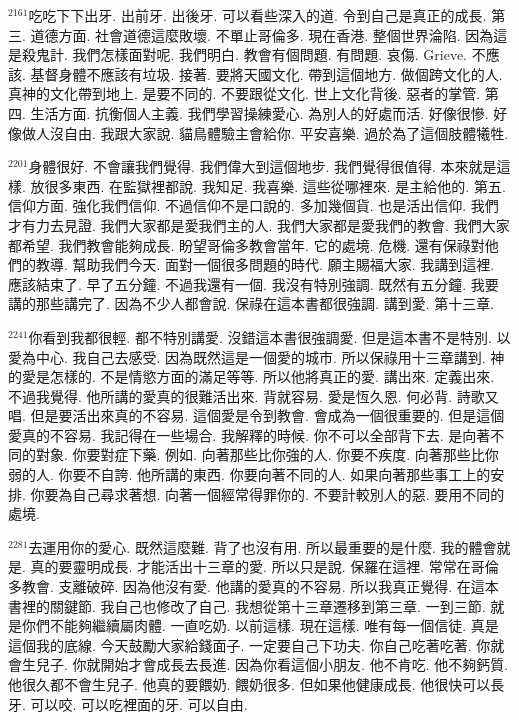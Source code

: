 \documentclass{book}
\begin{document}
$^{2161}$吃吃下下出牙.
出前牙.
出後牙.
可以看些深入的道.
令到自己是真正的成長.
第三.
道德方面.
社會道德這麼敗壞.
不單止哥倫多.
現在香港.
整個世界淪陷.
因為這是殺鬼計.
我們怎樣面對呢.
我們明白.
教會有個問題.
有問題.
哀傷.
Grieve.
不應該.
基督身體不應該有垃圾.
接著.
要將天國文化.
帶到這個地方.
做個跨文化的人.
真神的文化帶到地上.
是要不同的.
不要跟從文化.
世上文化背後.
惡者的掌管.
第四.
生活方面.
抗衡個人主義.
我們學習操練愛心.
為別人的好處而活.
好像很慘.
好像做人沒自由.
我跟大家說.
貓鳥體驗主會給你.
平安喜樂.
過於為了這個肢體犧牲.

$^{2201}$身體很好.
不會讓我們覺得.
我們偉大到這個地步.
我們覺得很值得.
本來就是這樣.
放很多東西.
在監獄裡都說.
我知足.
我喜樂.
這些從哪裡來.
是主給他的.
第五.
信仰方面.
強化我們信仰.
不過信仰不是口說的.
多加幾個貨.
也是活出信仰.
我們才有力去見證.
我們大家都是愛我們主的人.
我們大家都是愛我們的教會.
我們大家都希望.
我們教會能夠成長.
盼望哥倫多教會當年.
它的處境.
危機.
還有保祿對他們的教導.
幫助我們今天.
面對一個很多問題的時代.
願主賜福大家.
我講到這裡.
應該結束了.
早了五分鐘.
不過我還有一個.
我沒有特別強調.
既然有五分鐘.
我要講的那些講完了.
因為不少人都會說.
保祿在這本書都很強調.
講到愛.
第十三章.

$^{2241}$你看到我都很輕.
都不特別講愛.
沒錯這本書很強調愛.
但是這本書不是特別.
以愛為中心.
我自己去感受.
因為既然這是一個愛的城市.
所以保祿用十三章講到.
神的愛是怎樣的.
不是情慾方面的滿足等等.
所以他將真正的愛.
講出來.
定義出來.
不過我覺得.
他所講的愛真的很難活出來.
背就容易.
愛是恆久恩.
何必背.
詩歌又唱.
但是要活出來真的不容易.
這個愛是令到教會.
會成為一個很重要的.
但是這個愛真的不容易.
我記得在一些場合.
我解釋的時候.
你不可以全部背下去.
是向著不同的對象.
你要對症下藥.
例如.
向著那些比你強的人.
你要不疾度.
向著那些比你弱的人.
你要不自誇.
他所講的東西.
你要向著不同的人.
如果向著那些事工上的安排.
你要為自己尋求著想.
向著一個經常得罪你的.
不要計較別人的惡.
要用不同的處境.

$^{2281}$去運用你的愛心.
既然這麼難.
背了也沒有用.
所以最重要的是什麼.
我的體會就是.
真的要靈明成長.
才能活出十三章的愛.
所以只是說.
保羅在這裡.
常常在哥倫多教會.
支離破碎.
因為他沒有愛.
他講的愛真的不容易.
所以我真正覺得.
在這本書裡的關鍵節.
我自己也修改了自己.
我想從第十三章遷移到第三章.
一到三節.
就是你們不能夠繼續屬肉體.
一直吃奶.
以前這樣.
現在這樣.
唯有每一個信徒.
真是這個我的底線.
今天鼓勵大家給錢面子.
一定要自己下功夫.
你自己吃著吃著.
你就會生兒子.
你就開始才會成長去長進.
因為你看這個小朋友.
他不肯吃.
他不夠鈣質.
他很久都不會生兒子.
他真的要餵奶.
餵奶很多.
但如果他健康成長.
他很快可以長牙.
可以咬.
可以吃裡面的牙.
可以自由.
\end{document}

